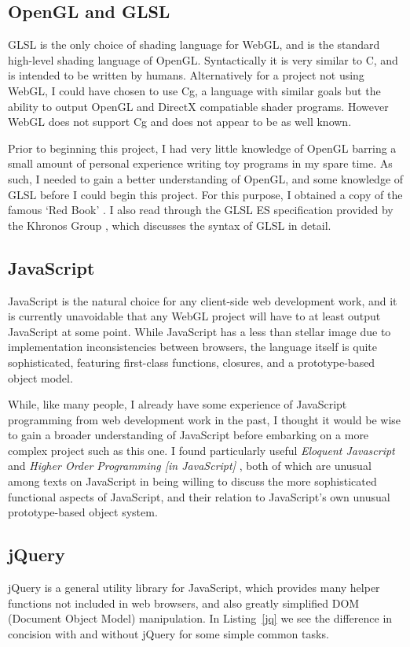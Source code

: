 \documentclass[12pt,twoside,notitlepage]{report}
\begin{document}
\subsection*{OpenGL and GLSL}
GLSL is the only choice of shading language for WebGL, and is the standard high-level shading language of OpenGL. Syntactically it is very similar to C, and is intended to be written by humans. Alternatively for a project not using WebGL, I could have chosen to use Cg, a language with similar goals but the ability to output OpenGL and DirectX compatiable shader programs. However WebGL does not support Cg and does not appear to be as well known. 

Prior to beginning this project, I had very little knowledge of OpenGL barring a small amount of personal experience writing toy programs in my spare time. As such, I needed to gain a better understanding of OpenGL, and some knowledge of GLSL before I could begin this project. For this purpose, I obtained a copy of the famous `Red Book' \citep{redbook}. I also read through the GLSL ES specification provided by the Khronos Group \citep{glsl-spec}, which discusses the syntax of GLSL in detail.

\subsection*{JavaScript}
JavaScript is the natural choice for any client-side web development work, and it is currently unavoidable that any WebGL project will have to at least output JavaScript at some point. While JavaScript has a less than stellar image due to implementation inconsistencies between browsers, the language itself is quite sophisticated, featuring first-class functions, closures, and a prototype-based object model.

While, like many people, I already have some experience of JavaScript programming from web development work in the past, I thought it would be wise to gain a broader understanding of JavaScript before embarking on a more complex project such as this one. I found particularly useful {\it Eloquent Javascript }\citep{eloquent} and {\it Higher Order Programming [in JavaScript] }\citep{higher-order}, both of which are unusual among texts on JavaScript in being willing to discuss the more sophisticated functional aspects of JavaScript, and their relation to JavaScript's own unusual prototype-based object system.

\subsection*{jQuery}
jQuery is a general utility library for JavaScript, which provides many helper functions not included in web browsers, and also greatly simplified DOM (Document Object Model) manipulation. In Listing~\ref{jq} we see the difference in concision with and without jQuery for some simple common tasks.
\end{document}
